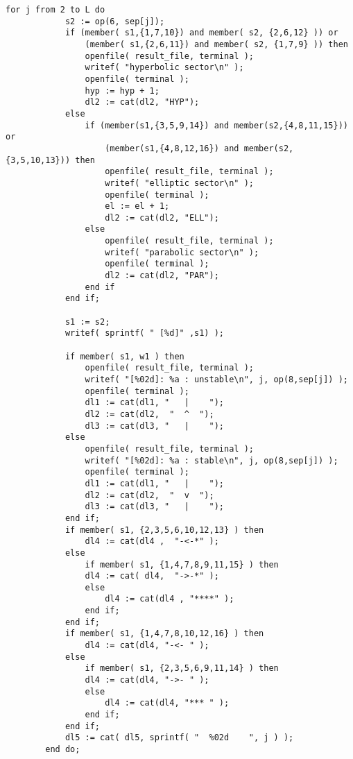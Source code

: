 \documentclass[a4paper,10pt]{article}
\begin{document}
\begin{lstlisting}[name=blowup]
        for j from 2 to L do
            s2 := op(6, sep[j]);
            if (member( s1,{1,7,10}) and member( s2, {2,6,12} )) or
                (member( s1,{2,6,11}) and member( s2, {1,7,9} )) then
                openfile( result_file, terminal );
                writef( "hyperbolic sector\n" );
                openfile( terminal );
                hyp := hyp + 1;
                dl2 := cat(dl2, "HYP");
            else
                if (member(s1,{3,5,9,14}) and member(s2,{4,8,11,15})) or
                    (member(s1,{4,8,12,16}) and member(s2,{3,5,10,13})) then
                    openfile( result_file, terminal );
                    writef( "elliptic sector\n" );
                    openfile( terminal );
                    el := el + 1;
                    dl2 := cat(dl2, "ELL");
                else
                    openfile( result_file, terminal );
                    writef( "parabolic sector\n" );
                    openfile( terminal );
                    dl2 := cat(dl2, "PAR");
                end if
            end if;

            s1 := s2;
            writef( sprintf( " [%d]" ,s1) );

            if member( s1, w1 ) then
                openfile( result_file, terminal );
                writef( "[%02d]: %a : unstable\n", j, op(8,sep[j]) );
                openfile( terminal );
                dl1 := cat(dl1, "   |    ");
                dl2 := cat(dl2,  "  ^  ");
                dl3 := cat(dl3, "   |    ");
            else
                openfile( result_file, terminal );
                writef( "[%02d]: %a : stable\n", j, op(8,sep[j]) );
                openfile( terminal );
                dl1 := cat(dl1, "   |    ");
                dl2 := cat(dl2,  "  v  ");
                dl3 := cat(dl3, "   |    ");
            end if;
            if member( s1, {2,3,5,6,10,12,13} ) then
                dl4 := cat(dl4 ,  "-<-*" );
            else
                if member( s1, {1,4,7,8,9,11,15} ) then
                dl4 := cat( dl4,  "->-*" );
                else
                    dl4 := cat(dl4 , "****" );
                end if;
            end if;
            if member( s1, {1,4,7,8,10,12,16} ) then
                dl4 := cat(dl4, "-<- " );
            else
                if member( s1, {2,3,5,6,9,11,14} ) then
                dl4 := cat(dl4, "->- " );
                else
                    dl4 := cat(dl4, "*** " );
                end if;
            end if;
            dl5 := cat( dl5, sprintf( "  %02d    ", j ) );
        end do;


\end{lstlisting}
\end{document}
